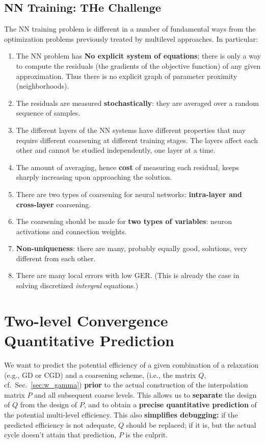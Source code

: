 \documentclass{article} %
\begin{document}
\subsection{NN Training: THe Challenge}
The NN training problem is different in a number of fundamental ways from the optimization problems previously treated by multilevel approaches. In particular:
\begin{enumerate}
	\item The NN problem has \textbf{No explicit system of equations}; there is only a way to compute the residuals (the gradients of the objective function) of any given approximation. Thus there is no explicit graph of parameter proximity (neighborhoods).
	\item The residuals are measured \textbf{stochastically}: they are averaged over a random sequence of samples.
        \item The different layers of the NN systems have different properties that may require different coarsening at different training stages. The layers affect each other and cannot be studied independently, one layer at a time.
	\item The amount of averaging, hence  \textbf{cost} of measuring each residual, keeps sharply increasing upon approaching the solution.
	\item There are two types of coarsening for neural networks: \textbf{intra-layer and cross-layer} coarsening.
	\item The coarsening should be made for \textbf{two types of variables}: neuron activations and connection weights.
	\item \textbf{Non-uniqueness}: there are many, probably equally good, solutions, very different from each other.
	\item There are many local errors with low GER. (This is already the case in solving discretized {\it intergral} equations.)
\end{enumerate}

\section{Two-level Convergence Quantitative Prediction}
\label{sec:mock_cycle}
We want to predict the potential efficiency of a given combination of a relaxation (e.g., GD or CGD) and a coarsening scheme, (i.e., the matrix $Q$, cf.~Sec.~\ref{sec:w_gamma}) \textbf{prior} to the actual construction of the interpolation matrix $P$ and all subsequent coarse levels. This allows us to \textbf{separate} the design of $Q$ from the design of $P$, and to obtain a \textbf{precise quantitative prediction} of the potential multi-level efficiency. This also \textbf{simplifies debugging:} if the predicted efficiency is not adequate, $Q$ should be replaced; if it is, but the actual cycle doesn't attain that prediction, $P$ is the culprit.
\end{document}
